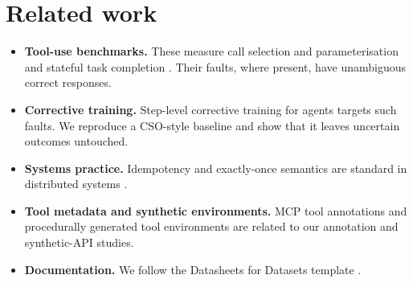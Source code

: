 \documentclass[11pt]{article}
\begin{document}
\section{Related work}
\begin{itemize}
\item \textbf{Tool-use benchmarks.} These measure call selection and parameterisation \citep{TODO_bfcl,TODO_apibank,TODO_toolllm} and stateful task completion \citep{TODO_taubench,TODO_tau2,TODO_appworld,TODO_toolsandbox}. Their faults, where present, have unambiguous correct responses.
\item \textbf{Corrective training.} Step-level corrective training for agents \citep{TODO_cso,TODO_skillcdpo} targets such faults. We reproduce a CSO-style baseline and show that it leaves uncertain outcomes untouched.
\item \textbf{Systems practice.} Idempotency and exactly-once semantics are standard in distributed systems \citep{TODO_idempotency}.
\item \textbf{Tool metadata and synthetic environments.} MCP tool annotations \citep{TODO_mcp} and procedurally generated tool environments \citep{TODO_synthetic} are related to our annotation and synthetic-API studies.
\item \textbf{Documentation.} We follow the Datasheets for Datasets template \citep{TODO_datasheets}.
\end{itemize}



\end{document}
